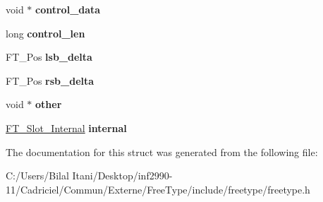 \begin{DoxyCompactItemize}
\item 
void $\ast$ {\bfseries control\+\_\+data}\hypertarget{struct_f_t___glyph_slot_rec___a2af67814d985bcdfcffdf7e8a36ebbdf}{}\label{struct_f_t___glyph_slot_rec___a2af67814d985bcdfcffdf7e8a36ebbdf}

\item 
long {\bfseries control\+\_\+len}\hypertarget{struct_f_t___glyph_slot_rec___a7a088255cb09abe42f19f650f48b6b3f}{}\label{struct_f_t___glyph_slot_rec___a7a088255cb09abe42f19f650f48b6b3f}

\item 
F\+T\+\_\+\+Pos {\bfseries lsb\+\_\+delta}\hypertarget{struct_f_t___glyph_slot_rec___a7d0d8c2eda28e38541e953186ecab89a}{}\label{struct_f_t___glyph_slot_rec___a7d0d8c2eda28e38541e953186ecab89a}

\item 
F\+T\+\_\+\+Pos {\bfseries rsb\+\_\+delta}\hypertarget{struct_f_t___glyph_slot_rec___a2ca5f5e7b92df3aee4584949fa6a2a1c}{}\label{struct_f_t___glyph_slot_rec___a2ca5f5e7b92df3aee4584949fa6a2a1c}

\item 
void $\ast$ {\bfseries other}\hypertarget{struct_f_t___glyph_slot_rec___ad0c5ab51842f178ba571bab2874f1bdb}{}\label{struct_f_t___glyph_slot_rec___ad0c5ab51842f178ba571bab2874f1bdb}

\item 
\hyperlink{struct_f_t___slot___internal_rec__}{F\+T\+\_\+\+Slot\+\_\+\+Internal} {\bfseries internal}\hypertarget{struct_f_t___glyph_slot_rec___a91731fd527eeab1d1acf3e1aea4bea84}{}\label{struct_f_t___glyph_slot_rec___a91731fd527eeab1d1acf3e1aea4bea84}

\end{DoxyCompactItemize}


The documentation for this struct was generated from the following file\+:\begin{DoxyCompactItemize}
\item 
C\+:/\+Users/\+Bilal Itani/\+Desktop/inf2990-\/11/\+Cadriciel/\+Commun/\+Externe/\+Free\+Type/include/freetype/freetype.\+h\end{DoxyCompactItemize}
